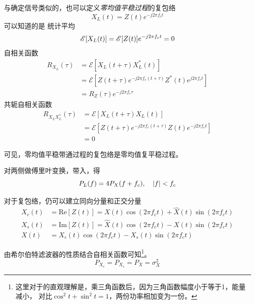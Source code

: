     与确定信号类似的，也可以定义\emph{零均值平稳过程}的复包络
    \begin{equation}
        X_L(t)=Z(t)e^{-j2\pi f_ct}
    \end{equation}
    可以知道的是
    统计平均
    \begin{equation}
        \mathscr{E}[X_L(t)]=\mathscr{E}[Z(t)]e^{-j2\pi f_ct}=0\\
    \end{equation}
    自相关函数
    \begin{equation}\label{eq:fubaoluozixiangguan}
        \begin{split}
            R_{X_L}(\tau)&=\mathscr{E}[X_L(t+\tau)X^*_L(t)]\\
                         &=\mathscr{E}[Z(t+\tau)e^{-j2\pi f_c(t+\tau)}Z^*(t)e^{j2\pi f_ct}]\\
                         &=R_Z(\tau)e^{-j2\pi f_c\tau}
        \end{split}
    \end{equation}
    共轭自相关函数
    \begin{equation}
        \begin{split}
            R_{X_LX_L^*}(\tau)  &=\mathscr{E}[X_L(t+\tau)X_L(t)]\\
                                &=\mathscr{E}[Z(t+\tau)e^{-j2\pi f_c(t+\tau)}Z(t)e^{-j2\pi f_ct}]\\
                                &=0
        \end{split}
    \end{equation}

    可见，零均值平稳带通过程的复包络是零均值复平稳过程。

    对两侧做傅里叶变换，带入，得
    \begin{equation}
        P_L(f)=4P_X(f+f_c),\hspace{1em}\left\vert f \right\vert<f_c
    \end{equation}

    对于复包络，仍可以建立同向分量和正交分量
    \begin{align}
        X_c(t)&=\text{Re}[Z(t)]=X(t)\cos(2\pi f_ct)+\hat{X}(t)\sin(2\pi f_ct)\\
        X_s(t)&=\text{Im}[Z(t)]=\hat{X}(t)\cos(2\pi f_ct)-X(t)\sin(2\pi f_ct)\\
        X(t)&=X_c(t)\cos(2\pi f_ct)-X_s(t)\sin(2\pi f_ct)\label{eq:x_x_c_x_s}
    \end{align}

    由希尔伯特滤波器的性质结合自相关函数可知\footnote{这里对于的直观理解是，乘三角函数后，因为三角函数幅度小于等于1，能量减小，
    对比$\cos^2t+\sin^2t=1$，两份功率相加变为一份。}。
    \begin{equation}
        P_{X_c}=P_{X_s}=P_{X}=\sigma_X^2
    \end{equation}

